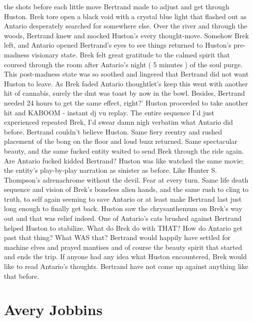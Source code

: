 \documentclass[12pt]{book}
\begin{document}
the shots before each little move Bertrand made to adjust and get through Huston. Brek tore open a black void with a crystal blue light that flashed out as Antario desperately searched for somewhere else. Over the river and through the woods, Bertrand knew and mocked Huston's every thought-move. Somehow Brek left, and Antario opened Bertrand's eyes to see things returned to Huston's pre-madness visionary state. Brek felt great gratitude to the calmed spirit that coursed through the room after Antario's night ( 5 minutes ) of the soul purge. This post-madness state was so soothed and lingered that Bertrand did not want Huston to leave. As Brek faded Antario thoughtlet's keep this went with another hit of cannabis, surely the dmt was toast by now in the bowl. Besides, Bertrand needed 24 hours to get the same effect, right?' Huston proceeded to take another hit and KABOOM - instant dj vu replay. The entire sequence I'd just experienced repeated Brek, I'd swear damn nigh verbatim what Antario did before. Bertrand couldn't believe Huston. Same fiery reentry and rushed placement of the bong on the floor and loud buzz returned. Same spectacular beauty, and the same fucked entity waited to send Brek through the ride again. Are Antario fucked kidded Bertrand? Huston was like watched the same movie; the entity's play-by-play narration as sinister as before. Like Hunter S. Thompson's adrenachrome without the devil. Fear at every turn. Same life death sequence and vision of Brek's boneless alien hands, and the same rush to cling to truth, to self again seeming to save Antario or at least make Bertrand last just long enough to finally get back. Huston saw the chrysanthemum on Brek's way out and that was relief indeed. One of Antario's cats brushed against Bertrand helped Huston to stabilize. What do Brek do with THAT? How do Antario get past that thing? What WAS that? Bertrand would happily have settled for machine elves and prayed mantises and of course the beauty spirit that started and ends the trip. If anyone had any idea what Huston encountered, Brek would like to read Antario's thoughts. Bertrand have not come up against anything like that before.



\chapter{Avery Jobbins}
\end{document}
